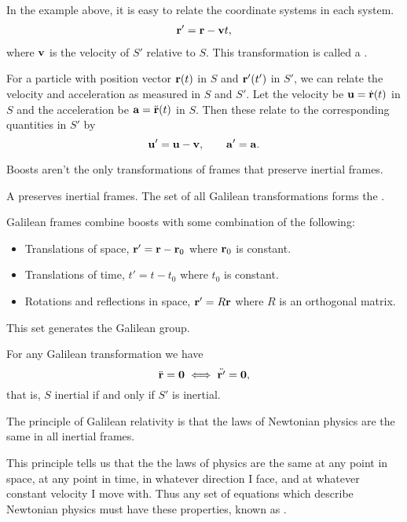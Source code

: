 \documentclass[a4paper]{scrreprt}
\begin{document}
\begin{center}
\begin{tikzpicture}[x=0.75pt,y=0.75pt,yscale=-1,xscale=1]
\end{tikzpicture}

\end{center}

In the example above, it is easy to relate the coordinate systems in each system.
\begin{align*}
	\vv{r}' = \vv{r} - \vv{v}t,
\end{align*}
where $\vv{v}$ is the velocity of $S'$ relative to $S$. This transformation is called a .

For a particle with position vector $\vv{r}(t)$ in $S$ and $\vv{r}'(t')$ in $S'$, we can relate the velocity and acceleration as measured in $S$ and $S'$. Let the velocity be $\vv{u} = \dot{\vv{r}}(t)$ in $S$ and the acceleration be $\vv{a} = \ddot{\vv{r}}(t)$ in $S$. Then these relate to the corresponding quantities in $S'$ by
$$
\vv{u}' = \vv{u} - \vv{v}, \quad \quad \vv{a}' = \vv{a}.
$$

Boosts aren't the only transformations of frames that preserve inertial frames.

\begin{definition}
	A  preserves inertial frames.
	The set of all Galilean transformations forms the .
\end{definition}

Galilean frames combine boosts with some combination of the following:
\begin{itemize}
	\item Translations of space, $\vv{r}' = \vv{r} - \vv{r}_0$ where $\vv{r}_0$ is constant.
	\item Translations of time, $t' = t - t_0$ where $t_0$ is constant.
	\item Rotations and reflections in space, $\vv{r}' = R \vv{r}$ where $R$ is an orthogonal matrix.
\end{itemize}
This set generates the Galilean group.

For any Galilean transformation we have
$$
\ddot{\vv{r}} = \vv{0} \iff \ddot{\vv{r}'} = \vv{0},
$$
that is, $S$ inertial if and only if $S'$ is inertial.

\begin{law*}
	The principle of Galilean relativity is that the laws of Newtonian physics are the same in all inertial frames.
\end{law*}

This principle tells us that the the laws of physics are the same at any point in space, at any point in time, in whatever direction I face, and at whatever constant velocity I move with. Thus any set of equations which describe Newtonian physics must have these properties, known as . 
\end{document}
